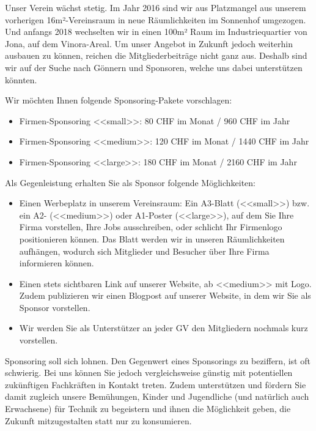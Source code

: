 \documentclass[10pt,a4paper,parskip,fleqn]{scrartcl}
\begin{document}
Unser Verein wächst stetig. Im Jahr 2016 sind wir aus Platzmangel aus unserem
vorherigen 16m²-Vereinsraum in neue Räumlichkeiten im Sonnenhof umgezogen. Und
anfangs 2018 wechselten wir in einen 100m² Raum im Industriequartier von Jona,
auf dem Vinora-Areal. Um unser Angebot in Zukunft jedoch weiterhin ausbauen zu
können, reichen die Mitgliederbeiträge nicht ganz aus. Deshalb sind wir auf der
Suche nach Gönnern und Sponsoren, welche uns dabei unterstützen könnten.

Wir möchten Ihnen folgende Sponsoring-Pakete vorschlagen:

\begin{itemize}
	\item Firmen-Sponsoring <<small>>: 80 CHF im Monat / 960 CHF im Jahr
	\item Firmen-Sponsoring <<medium>>: 120 CHF im Monat / 1440 CHF im Jahr
	\item Firmen-Sponsoring <<large>>: 180 CHF im Monat / 2160 CHF im Jahr
\end{itemize}

Als Gegenleistung erhalten Sie als Sponsor folgende Möglichkeiten:

\begin{itemize}
	\item Einen Werbeplatz in unserem Vereinsraum: Ein A3-Blatt (<<small>>) bzw.
		ein A2- (<<medium>>) oder A1-Poster (<<large>>), auf dem Sie Ihre Firma
		vorstellen, Ihre Jobs ausschreiben, oder schlicht Ihr Firmenlogo
		positionieren können. Das Blatt werden wir in unseren Räumlichkeiten
		aufhängen, wodurch sich Mitglieder und Besucher über Ihre Firma
		informieren können.
	\item Einen stets sichtbaren Link auf unserer Website, ab <<medium>> mit Logo.
		Zudem publizieren wir einen Blogpost auf unserer Website, in dem wir Sie als
		Sponsor vorstellen.
	\item Wir werden Sie als Unterstützer an jeder GV den Mitgliedern nochmals
		kurz vorstellen.
\end{itemize}

Sponsoring soll sich lohnen. Den Gegenwert eines Sponsorings zu beziffern, ist
oft schwierig. Bei uns können Sie jedoch vergleichsweise günstig mit
potentiellen zukünftigen Fachkräften in Kontakt treten. Zudem unterstützen und
fördern Sie damit zugleich unsere Bemühungen, Kinder und Jugendliche (und
natürlich auch Erwachsene) für Technik zu begeistern und ihnen die Möglichkeit
geben, die Zukunft mitzugestalten statt nur zu konsumieren.
\end{document}
